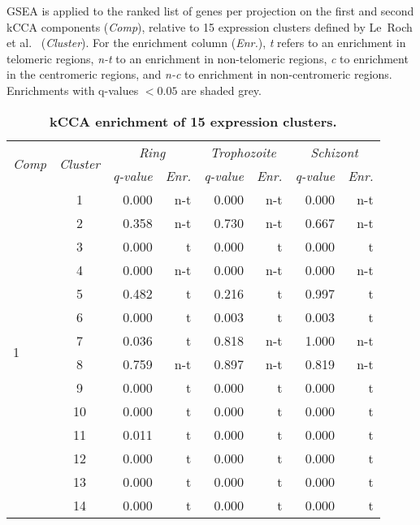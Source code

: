 \documentclass{article}
\newcommand{\gr}{\cellcolor[gray]{0.9}}
\begin{document}
\begin{table}
\caption{{\bf kCCA enrichment of 15 expression clusters.}}
{\normalsize GSEA is applied to the ranked list of genes per projection on the
    first and second kCCA components (\emph{Comp}), relative to 15 expression clusters defined by Le~Roch
    et al.~\cite{leroch:discovery} (\emph{Cluster}). For the enrichment
    column (\emph{Enr.}), \emph{t} refers to an enrichment in telomeric
    regions, \emph{n-t} to an enrichment in non-telomeric regions,
    \emph{c} to enrichment in the centromeric regions, and \emph{n-c} to
    enrichment in non-centromeric regions. Enrichments with q-values
    $< 0.05$ are shaded grey.}
\vspace{10pt}
\begin{center}
\begin{tabular}{lc|rr|rr|rr}
\hline
\multirow{2}{*}{\emph{Comp}}
& \multirow{2}{*}{\emph{Cluster}}
& \multicolumn{2}{c}{\emph{Ring}}
& \multicolumn{2}{|c}{\emph{Trophozoite}}
& \multicolumn{2}{|c}{\emph{Schizont}} \\
& & \emph{q-value}  & \emph{Enr.} &
\emph{q-value}  & \emph{Enr.} &
\emph{q-value}  & \emph{Enr.} \\
\hline
\multirow{15}{*}{1}
& 1  & \gr 0.000 & n-t & \gr 0.000  &  n-t & \gr 0.000 & n-t \\
& 2  & 0.358     & n-t &  0.730     &  n-t  & 0.667    & n-t  \\
& 3  & \gr 0.000 & t & \gr 0.000  &  t & \gr 0.000 & t \\
& 4  & \gr 0.000 & n-t & \gr 0.000  &  n-t & \gr 0.000 & n-t \\
& 5  & 0.482     & t & 0.216      &  t  & 0.997    & t  \\
& 6  & \gr 0.000 & t & \gr 0.003  &  t & \gr 0.003 & t \\
& 7  & \gr 0.036 & t & 0.818      &  n-t  & 1.000    & n-t  \\
& 8  & 0.759     & n-t & 0.897      &  n-t  & 0.819    & n-t \\
& 9  & \gr 0.000 & t & \gr 0.000  &  t & \gr 0.000 & t \\
& 10 & \gr 0.000 & t & \gr 0.000  &  t & \gr 0.000 & t \\
& 11 & \gr 0.011 & t & \gr 0.000  &  t & \gr 0.000 & t \\
& 12 & \gr 0.000 & t & \gr 0.000  &  t & \gr 0.000 & t \\
& 13 & \gr 0.000 & t & \gr 0.000  &  t & \gr 0.000 & t \\
& 14 & \gr 0.000 & t & \gr 0.000  &  t & \gr 0.000 & t \\

\end{tabular}
\end{center}
\end{table}
\end{document}
